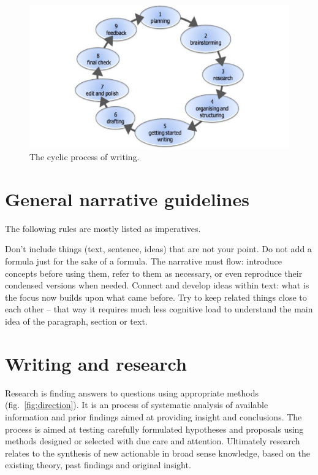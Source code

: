 \documentclass[10pt,a4paper,twocolumn]{article}
\begin{document}
\begin{figure}
  \centering
  \includegraphics[width=\columnwidth]{assets/iterative_process.pdf}
  \caption{
    The cyclic process of writing.
  }
\end{figure}


\section{General narrative guidelines} %
\label{sec:general_narrative_guidelines}

The following rules are mostly listed as imperatives.

Don't include things (text, sentence, ideas) that are not your point. Do not add a formula
just for the sake of a formula. The narrative must flow: introduce concepts before using
them, refer to them as necessary, or even reproduce their condensed versions when needed.
Connect and develop ideas within text: what is the focus now builds upon what came before.
Try to keep related things close to each other -- that way it requires much less cognitive
load to understand the main idea of the paragraph, section or text.


\section{Writing and research} %
\label{sec:writing_and_research}

Research is finding answers to questions using appropriate methods (fig.~\ref{fig:direction}).
It is an process of systematic analysis of available information and prior findings
aimed at providing insight and conclusions. The process is aimed at testing carefully
formulated hypotheses and proposals using methods designed or selected with due care
and attention. Ultimately research relates to the synthesis of new actionable in broad
sense knowledge, based on the existing theory, past findings and original insight.
\end{document}
